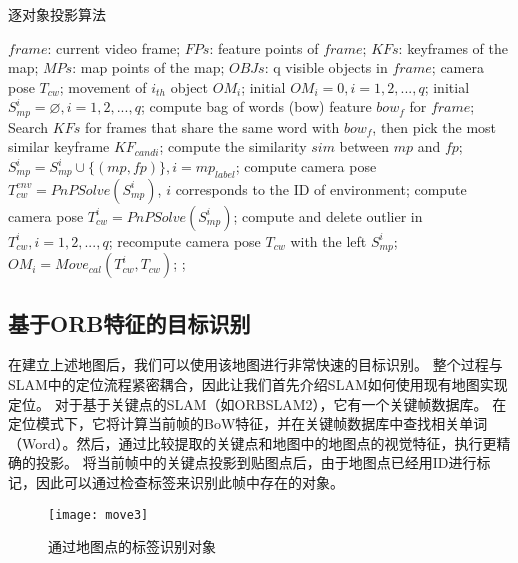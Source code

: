 \begin{algorithm}[htb]  
	\caption{逐对象投影算法}  
	\label{alg::poa}  
	\begin{algorithmic}[1]  
		\Require  
		$frame$: current video frame;
		$FPs$: feature points of $frame$;  
		$KFs$: keyframes of the map;  
		$MPs$: map points of the map;
		$OBJs$: q visible objects in $frame$;   
		\Ensure  
		camera pose $T_{cw}$;
		movement of $i_{th}$ object $OM_i$;
		\State initial $OM_i=0, i = 1,2,...,q$;
		\State initial $S_{mp}^i=\varnothing, i=1,2,...,q$;
		\State compute bag of words (bow) feature $bow_f$ for $frame$;
		\State Search $KFs$ for frames that share the same word with $bow_f$, then pick the most similar keyframe $KF_{candi}$;
		compute the similarity $sim$ between $mp$ and $fp$;
		\State $S_{mp}^i = S_{mp}^i\cup\{(mp,fp)\}, i = mp_{label}$;
		\EndIf
		\EndFor 
		\EndFor
		\State compute camera pose $T_{cw}^{env} = PnPSolve(S_{mp}^i)$, $i$ corresponds to the ID of environment;
		\State compute camera pose $T_{cw}^{i} = PnPSolve(S_{mp}^i)$;
		\EndFor
		\EndFor
		\State compute and delete outlier in ${T_{cw}^{i}, i=1,2,...,q}$;
		\State recompute camera pose $T_{cw}$ with the left $S_{mp}^i$;
		\State $OM_i = Move_{cal}(T_{cw}^{i}, T_{cw})$; 
		\Else 
		;
		\EndIf
	\end{algorithmic}
\end{algorithm}  

\subsection{基于ORB特征的目标识别}

在建立上述地图后，我们可以使用该地图进行非常快速的目标识别。
整个过程与SLAM中的定位流程紧密耦合，因此让我们首先介绍SLAM如何使用现有地图实现定位。
对于基于关键点的SLAM（如ORBSLAM2），它有一个关键帧数据库。
在定位模式下，它将计算当前帧的BoW特征，并在关键帧数据库中查找相关单词（Word）。然后，通过比较提取的关键点和地图中的地图点的视觉特征，执行更精确的投影。
将当前帧中的关键点投影到贴图点后，由于地图点已经用ID进行标记，因此可以通过检查标签来识别此帧中存在的对象。

\begin{figure}[htb]
	\centering
	\texttt{[image: move3]}
	\caption{通过地图点的标签识别对象}
	\label{fig:match}
\end{figure}

